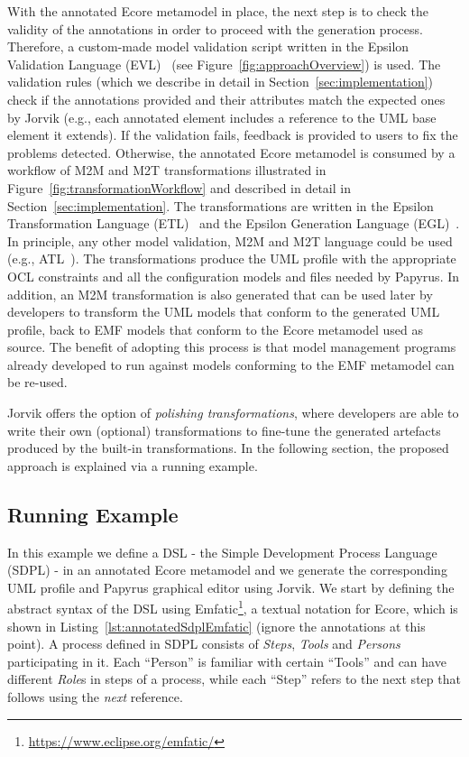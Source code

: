 With the annotated Ecore metamodel in place, the next step is to check the validity of the annotations in order to proceed with the generation process. 
Therefore, a custom-made model validation script written in the Epsilon Validation Language (EVL)~\cite{evlKolovos} (see Figure~\ref{fig:approachOverview}) is used.
The validation rules (which we describe in detail in Section~\ref{sec:implementation}) check if the annotations provided and their attributes match the expected ones by Jorvik (e.g., each annotated element includes a reference to the UML base element it extends). 
If the validation fails, feedback is provided to users to fix the problems detected. 
Otherwise, the annotated Ecore metamodel is consumed by a workflow of M2M and M2T  transformations illustrated in Figure~\ref{fig:transformationWorkflow} and described in detail in Section~\ref{sec:implementation}. 
The transformations are written in the Epsilon Transformation Language (ETL)~\cite{Kolovos2008} and the Epsilon Generation Language (EGL)~\cite{rose2008egl}. 
In principle, any other model validation, M2M and M2T language could be used (e.g., ATL~\cite{jouault2006atl}). 
The transformations produce the UML profile with the appropriate OCL constraints and all the configuration models and files needed by Papyrus. 
In addition, an M2M transformation is also generated that can be used later by developers to transform the UML models that conform to the generated UML profile, back to EMF models that conform to the Ecore metamodel used as source. 
The benefit of adopting this process is that model management programs already developed to run against models conforming to the EMF metamodel can be re-used.

Jorvik offers the option of \textit{polishing transformations}, where developers are able to write their own (optional) transformations to fine-tune the generated artefacts produced by the built-in transformations. 
In the following section, the proposed approach is explained via a running example.

\subsection{Running Example}
\label{sec:example}
In this example we define a DSL - the Simple Development Process Language (SDPL) - in an annotated Ecore metamodel and we generate the corresponding UML profile and Papyrus graphical editor using Jorvik.
We start by defining the abstract syntax of the DSL using  Emfatic\footnote{\url{https://www.eclipse.org/emfatic/}}, a textual notation for Ecore, which is shown in Listing~\ref{lst:annotatedSdplEmfatic} (ignore the annotations at this point). 
A process defined in SDPL consists of \textit{Steps}, \textit{Tools} and \textit{Persons} participating in it. 
Each ``Person'' is familiar with certain ``Tools'' and can have different \textit{Role}s in steps of a process, while each ``Step'' refers to the next step that follows using the \textit{next} reference.

